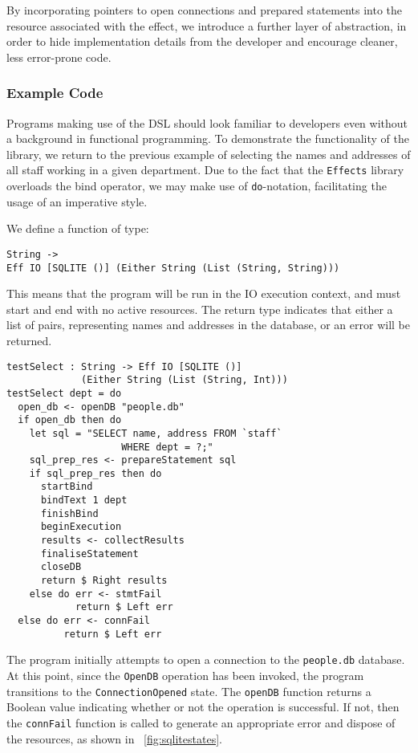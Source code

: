 By incorporating pointers to open connections and prepared statements into the resource associated with the effect, we introduce a further layer of abstraction, in order to hide implementation details from the developer and encourage cleaner, less error-prone code. 

\subsubsection{Example Code}
Programs making use of the DSL should look familiar to developers even without a background in functional programming. To demonstrate the functionality of the library, we return to the previous example of selecting the names and addresses of all staff working in a given department. Due to the fact that the \texttt{Effects} library overloads the bind operator, we may make use of \texttt{do}-notation, facilitating the usage of an imperative style.

We define a function of type:
\begin{Verbatim}
String ->
Eff IO [SQLITE ()] (Either String (List (String, String)))
\end{Verbatim}
This means that the program will be run in the IO execution context, and must start and end with no active resources. The return type indicates that either a list of  pairs, representing names and addresses in the database, or an error will be returned. 
\begin{Verbatim}
testSelect : String -> Eff IO [SQLITE ()] 
             (Either String (List (String, Int)))
testSelect dept = do
  open_db <- openDB "people.db"
  if open_db then do
    let sql = "SELECT name, address FROM `staff` 
                    WHERE dept = ?;"
    sql_prep_res <- prepareStatement sql
    if sql_prep_res then do 
      startBind
      bindText 1 dept
      finishBind
      beginExecution
      results <- collectResults
      finaliseStatement
      closeDB
      return $ Right results
    else do err <- stmtFail
            return $ Left err
  else do err <- connFail
          return $ Left err 
\end{Verbatim}
The program initially attempts to open a connection to the \texttt{people.db} database. At this point, since the \texttt{OpenDB} operation has been invoked, the program transitions to the \texttt{ConnectionOpened} state. The \texttt{openDB} function returns a Boolean value indicating whether or not the operation is successful. If not, then the \texttt{connFail} function is called to generate an appropriate error and dispose of the resources, as shown in ~\ref{fig:sqlitestates}.

